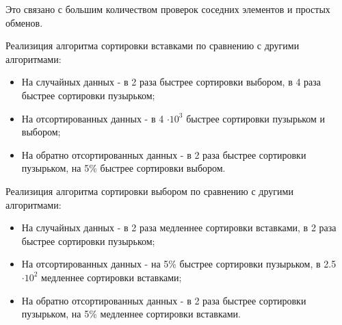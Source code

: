 Это связано с большим количеством проверок соседних элементов и простых обменов.

Реализиция алгоритма сортировки вставками по сравнению с другими алгоритмами:
\begin{itemize}
	\item На случайных данных - в 2 раза быстрее сортировки выбором, в 4 раза быстрее сортировки пузырьком;
	\item На отсортированных данных - в 4 $\cdot 10^3$ быстрее сортировки пузырьком и выбором;
	\item На обратно отсортированных данных - в 2 раза быстрее сортировки пузырьком, на 5\% быстрее сортировки выбором.
\end{itemize}

Реализиция алгоритма сортировки выбором по сравнению с другими алгоритмами:
\begin{itemize}
	\item На случайных данных - в 2 раза медленнее сортировки вставками, в 2 раза быстрее сортировки пузырьком;
	\item На отсортированных данных - на 5\% быстрее сортировки пузырьком, в 2.5 $\cdot 10^2$ медленнее сортировки вставками;
	\item На обратно отсортированных данных - в 2 раза быстрее сортировки пузырьком, на 5\% медленнее сортировки вставками.
\end{itemize}